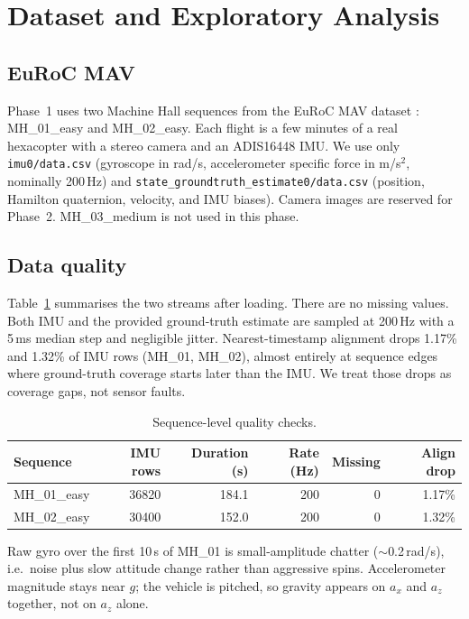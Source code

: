 
\section{Dataset and Exploratory Analysis}
\label{sec:dataset-eda}

\subsection{EuRoC MAV}
Phase~1 uses two Machine Hall sequences from the EuRoC MAV dataset
\cite{burri2016euroc}: MH\_01\_easy and MH\_02\_easy. Each flight is a
few minutes of a real hexacopter with a stereo camera and an ADIS16448
IMU. We use only \texttt{imu0/data.csv} (gyroscope in rad/s,
accelerometer specific force in m/s$^2$, nominally 200\,Hz) and
\texttt{state\_groundtruth\_estimate0/\allowbreak data.csv} (position, Hamilton
quaternion, velocity, and IMU biases). Camera images are reserved for
Phase~2. MH\_03\_medium is not used in this phase.

\subsection{Data quality}
Table~\ref{tab:quality} summarises the two streams after loading.
There are no missing values. Both IMU and the provided ground-truth
estimate are sampled at 200\,Hz with a 5\,ms median step and negligible
jitter. Nearest-timestamp alignment drops 1.17\% and 1.32\% of IMU rows
(MH\_01, MH\_02), almost entirely at sequence edges where ground-truth
coverage starts later than the IMU. We treat those drops as coverage
gaps, not sensor faults.

\begin{table}[htbp]
\centering
\caption{Sequence-level quality checks.}
\label{tab:quality}
\begin{tabular}{lrrrrr}
\hline
Sequence & IMU rows & Duration (s) & Rate (Hz) & Missing & Align drop \\
\hline
MH\_01\_easy & 36820 & 184.1 & 200 & 0 & 1.17\% \\
MH\_02\_easy & 30400 & 152.0 & 200 & 0 & 1.32\% \\
\hline
\end{tabular}
\end{table}

Raw gyro over the first 10\,s of MH\_01 is small-amplitude chatter
($\sim$0.2\,rad/s), i.e.\ noise plus slow attitude change rather than
aggressive spins. Accelerometer magnitude stays near $g$; the vehicle is
pitched, so gravity appears on $a_x$ and $a_z$ together, not on $a_z$
alone.

